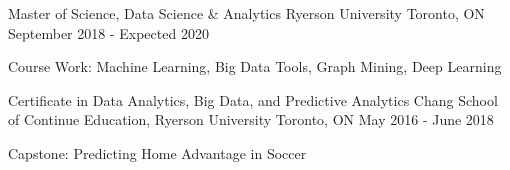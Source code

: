 

\begin{cventries}

  \cventry
    {Master of Science, Data Science \& Analytics} %
    {Ryerson University} %
    {Toronto, ON} %
    {September 2018 - Expected 2020} %
    {
      \begin{cvitems} %
      \item {Course Work: Machine Learning, Big Data Tools, Graph Mining, Deep Learning}
      \end{cvitems}
    }

 \cventry
    {Certificate in Data Analytics, Big Data, and Predictive Analytics} 
    {Chang School of Continue Education, Ryerson University} %
    {Toronto, ON} %
    {May 2016 - June 2018} %
    {
      \begin{cvitems} %
      \item {Capstone: Predicting Home Advantage in Soccer}
      \end{cvitems}
    }
    
 \end{cventries}   

